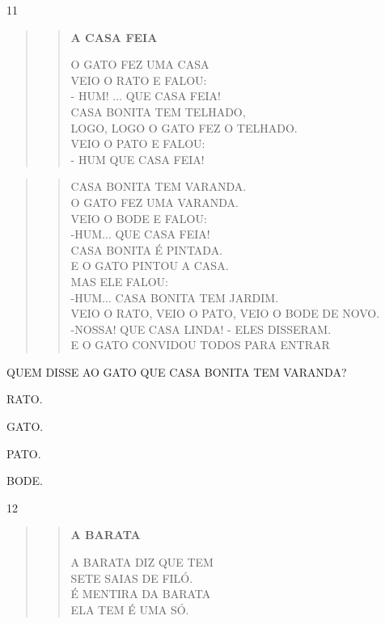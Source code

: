\num{11}

\begin{quote}
\begin{verse}
\textbf{A CASA FEIA}

O GATO FEZ UMA CASA\\
VEIO O RATO E FALOU:\\
- HUM! ... QUE CASA FEIA!\\
CASA BONITA TEM TELHADO,\\
LOGO, LOGO O GATO FEZ O TELHADO.\\
VEIO O PATO E FALOU:\\
- HUM QUE CASA FEIA!
\end{verse}
\end{quote}

\begin{quote}
\begin{verse}
CASA BONITA TEM VARANDA.\\
O GATO FEZ UMA VARANDA.\\
VEIO O BODE E FALOU:\\
-HUM... QUE CASA FEIA!\\
CASA BONITA É PINTADA.\\
E O GATO PINTOU A CASA.\\
MAS ELE FALOU:\\
-HUM... CASA BONITA TEM JARDIM.\\
VEIO O RATO, VEIO O PATO, VEIO O BODE DE NOVO.\\
-NOSSA! QUE CASA LINDA! - ELES DISSERAM.\\
E O GATO CONVIDOU TODOS PARA ENTRAR
\end{verse}

\end{quote}	

QUEM DISSE AO GATO QUE CASA BONITA TEM VARANDA? 

\begin{escolha}
\item RATO.

\item GATO.

\item PATO.

\item BODE.
\end{escolha}

\num{12}\enlargethispage{2\baselineskip}

\begin{quote}
\begin{verse}
\textbf{A BARATA}

A BARATA DIZ QUE TEM\\
SETE SAIAS DE FILÓ.\\
É MENTIRA DA BARATA\\
ELA TEM É UMA SÓ.
\end{verse}
\end{quote}

